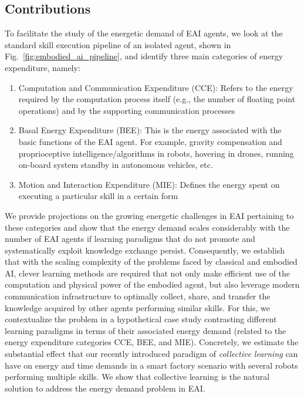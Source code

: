\subsection{Contributions}
To facilitate the study of the energetic demand of EAI agents, we look at the standard skill execution pipeline of an isolated agent, shown in Fig.~\ref{fig:embodied_ai_pipeline}, and identify three main categories of energy expenditure, namely:
\begin{enumerate}
	\item Computation and Communication Expenditure (CCE): Refers to the energy required by the computation process itself (e.g., the number of floating point operations) and by the supporting communication processes
	\item Basal Energy Expenditure (BEE): This is the energy associated with the basic functions of the EAI agent. For example, gravity compensation and proprioceptive intelligence/algorithms in robots, hovering in drones, running on-board system standby in autonomous vehicles, etc.
	\item Motion and Interaction Expenditure (MIE): Defines the energy spent on executing a particular skill in a certain form
\end{enumerate}
We provide projections on the growing energetic challenges in EAI pertaining to these categories and show that the energy demand scales considerably with the number of EAI agents if learning paradigms that do not promote and systematically exploit knowledge exchange persist. Consequently, we establish that with the scaling complexity of the problems faced by classical and embodied AI, clever learning methods are required that not only make efficient use of the computation and physical power of the embodied agent, but also leverage modern communication infrastructure to optimally collect, share, and transfer the knowledge acquired by other agents performing similar skills. For this, we contextualize the problem in a hypothetical case study contrasting different learning paradigms in terms of their associated energy demand (related to the energy expenditure categories CCE, BEE, and MIE). Concretely, we estimate the substantial effect that our recently introduced paradigm of \emph{collective learning} \cite{Haddadin2014SystemzumErstellen,Haddadin2015Systemgeneratingsets} can have on energy and time demands in a smart factory scenario with several robots performing multiple skills. We show that collective learning is the natural solution to address the energy demand problem in EAI.

